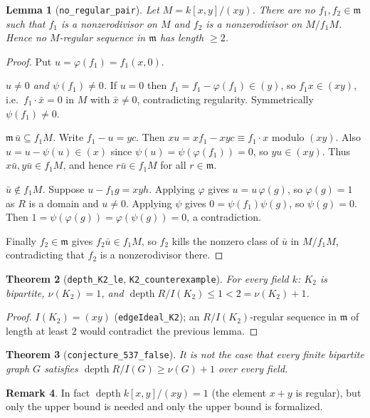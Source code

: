 \documentclass[11pt]{article}
\newtheorem{theorem}{Theorem}
\newtheorem{lemma}[theorem]{Lemma}
\theoremstyle{definition}
\newtheorem{remark}[theorem]{Remark}
\begin{document}
\begin{lemma}[\texttt{no\_regular\_pair}]
Let $M = k[x,y]/(xy)$. There are no $f_1,f_2\in\mathfrak m$ such that $f_1$ is a nonzerodivisor on $M$ and $f_2$ is
a nonzerodivisor on $M/f_1M$. Hence no $M$-regular sequence in $\mathfrak m$ has length $\ge 2$.
\end{lemma}
\begin{proof}
Put $u = \varphi(f_1) = f_1(x,0)$.

\emph{$u\neq 0$ and $\psi(f_1)\ne 0$.} If $u=0$ then $f_1 = f_1-\varphi(f_1) \in (y)$, so $f_1 x \in (xy)$, i.e.\
$f_1\cdot \bar x = 0$ in $M$ with $\bar x \neq 0$, contradicting regularity. Symmetrically $\psi(f_1) \ne 0$.

\emph{$\mathfrak m\, \bar u \subseteq f_1 M$.} Write $f_1 - u = yc$. Then $xu = x f_1 - xyc \equiv f_1\cdot x$
modulo $(xy)$. Also $u = u - \psi(u) \in (x)$ since $\psi(u) = \psi(\varphi(f_1)) = 0$, so $yu \in (xy)$. Thus
$x\bar u, y\bar u \in f_1 M$, and hence $r\bar u\in f_1M$ for all $r \in \mathfrak m$.

\emph{$\bar u \notin f_1M$.} Suppose $u - f_1 g = xyh$. Applying $\varphi$ gives $u = u\,\varphi(g)$, so
$\varphi(g)=1$ as $R$ is a domain and $u \ne 0$. Applying $\psi$ gives $0 = \psi(f_1)\psi(g)$, so $\psi(g) = 0$.
Then $1 = \psi(\varphi(g)) = \varphi(\psi(g)) = 0$, a contradiction.

Finally $f_2\in\mathfrak m$ gives $f_2 \bar u \in f_1M$, so $f_2$ kills the nonzero class of $\bar u$ in
$M/f_1M$, contradicting that $f_2$ is a nonzerodivisor there.
\end{proof}

\begin{theorem}[\texttt{depth\_K2\_le}, \texttt{K2\_counterexample}]
For every field $k$: $K_2$ is bipartite, $\nu(K_2) = 1$, and $\operatorname{depth} R/I(K_2) \le 1 < 2 = \nu(K_2)+1$.
\end{theorem}
\begin{proof}
$I(K_2) = (xy)$ (\texttt{edgeIdeal\_K2}); an $R/I(K_2)$-regular sequence in $\mathfrak m$ of length at least $2$
would contradict the previous lemma.
\end{proof}

\begin{theorem}[\texttt{conjecture\_537\_false}]
It is not the case that every finite bipartite graph $G$ satisfies $\operatorname{depth} R/I(G) \ge \nu(G)+1$ over
every field.
\end{theorem}

\begin{remark}
In fact $\operatorname{depth} k[x,y]/(xy) = 1$ (the element $x+y$ is regular), but only the upper bound is needed
and only the upper bound is formalized.
\end{remark}
\end{document}
